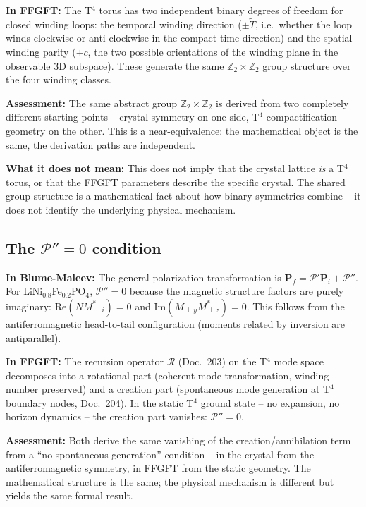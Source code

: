 \textbf{In FFGFT:} The T$^4$ torus has two independent binary degrees of
freedom for closed winding loops: the temporal winding direction ($\pm\tilde{T}$,
i.e.\ whether the loop winds clockwise or anti-clockwise in the compact time
direction) and the spatial winding parity ($\pm c$, the two possible
orientations of the winding plane in the observable 3D subspace). These
generate the same $\mathbb{Z}_2\times\mathbb{Z}_2$ group structure over the
four winding classes.

\textbf{Assessment:} The same abstract group $\mathbb{Z}_2\times\mathbb{Z}_2$
is derived from two completely different starting points -- crystal symmetry
on one side, T$^4$ compactification geometry on the other. This is a
near-equivalence: the mathematical object is the same, the derivation paths
are independent.

\textbf{What it does not mean:} This does not imply that the crystal lattice
\emph{is} a T$^4$ torus, or that the FFGFT parameters describe the specific
crystal. The shared group structure is a mathematical fact about how binary
symmetries combine -- it does not identify the underlying physical mechanism.

\subsection{The $\mathcal{P}'' = 0$ condition}

\textbf{In Blume-Maleev:} The general polarization transformation is
$\mathbf{P}_f = \mathcal{P}'\mathbf{P}_i + \mathcal{P}''$. For
LiNi$_{0.8}$Fe$_{0.2}$PO$_4$, $\mathcal{P}'' = 0$ because the magnetic
structure factors are purely imaginary: $\mathrm{Re}(NM_{\perp i}^*) = 0$
and $\mathrm{Im}(M_{\perp y}M_{\perp z}^*) = 0$. This follows from the
antiferromagnetic head-to-tail configuration (moments related by inversion
are antiparallel).

\textbf{In FFGFT:} The recursion operator $\mathcal{R}$ (Doc.~203) on the
T$^4$ mode space decomposes into a rotational part (coherent mode
transformation, winding number preserved) and a creation part (spontaneous
mode generation at T$^4$ boundary nodes, Doc.~204). In the static T$^4$
ground state -- no expansion, no horizon dynamics -- the creation part
vanishes: $\mathcal{P}'' = 0$.

\textbf{Assessment:} Both derive the same vanishing of the creation/annihilation
term from a ``no spontaneous generation'' condition -- in the crystal from the
antiferromagnetic symmetry, in FFGFT from the static geometry. The mathematical
structure is the same; the physical mechanism is different but yields the same
formal result.

